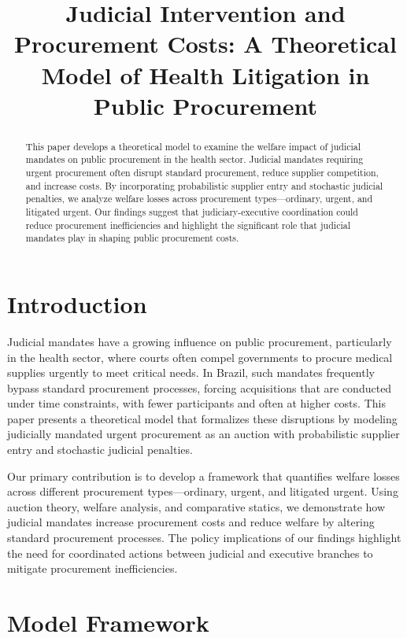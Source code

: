 \documentclass[12pt]{article}
\title{Judicial Intervention and Procurement Costs: A Theoretical Model of Health Litigation in Public Procurement}
\author{}
\date{}
\begin{document}
\maketitle

\begin{abstract}
This paper develops a theoretical model to examine the welfare impact of judicial mandates on public procurement in the health sector. Judicial mandates requiring urgent procurement often disrupt standard procurement, reduce supplier competition, and increase costs. By incorporating probabilistic supplier entry and stochastic judicial penalties, we analyze welfare losses across procurement types—ordinary, urgent, and litigated urgent. Our findings suggest that judiciary-executive coordination could reduce procurement inefficiencies and highlight the significant role that judicial mandates play in shaping public procurement costs.
\end{abstract}

\section{Introduction}
Judicial mandates have a growing influence on public procurement, particularly in the health sector, where courts often compel governments to procure medical supplies urgently to meet critical needs. In Brazil, such mandates frequently bypass standard procurement processes, forcing acquisitions that are conducted under time constraints, with fewer participants and often at higher costs. This paper presents a theoretical model that formalizes these disruptions by modeling judicially mandated urgent procurement as an auction with probabilistic supplier entry and stochastic judicial penalties.

Our primary contribution is to develop a framework that quantifies welfare losses across different procurement types—ordinary, urgent, and litigated urgent. Using auction theory, welfare analysis, and comparative statics, we demonstrate how judicial mandates increase procurement costs and reduce welfare by altering standard procurement processes. The policy implications of our findings highlight the need for coordinated actions between judicial and executive branches to mitigate procurement inefficiencies.

\section{Model Framework}
\end{document}
